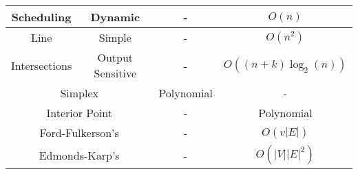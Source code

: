 \begin{center}
\begin{tabular}{| c | c | c | c |}
        Scheduling        & Dynamic   & - & $O(n)$ \\
        \hline \hline
        Line          & Simple           & - & $O(n^2)$ \\
        Intersections & Output Sensitive & - & $O((n + k)\log_2(n))$ \\
        \hline\hline
        \multicolumn{2}{|c|}{Simplex}        & Polynomial & - \\ 
        \hline
        \multicolumn{2}{|c|}{Interior Point} & -          & Polynomial \\ 
        \hline \hline 
        \multicolumn{2}{|c|}{Ford-Fulkerson's} & - & $O(v|E|)$ \\
        \hline
        \multicolumn{2}{|c|}{Edmonds-Karp's} & - & $O(|V||E|^2)$ \\
        \hline
    \end{tabular}
\end{center}